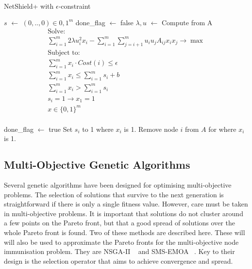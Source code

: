 \documentclass[11pt]{article}
\theoremstyle{definition}
\newcommand*\Let[2]{\State #1 $\gets$ #2}
\begin{document}
\begin{algorithm}
  \caption{NetShield+ with $\epsilon$-constraint
    \label{alg:enetshieldp}}
  \begin{algorithmic}[1]
    
    \Statex
    \Let{$s$}{ $(0,..,0) \in {0,1}^m $}
    \Let{done\_flag}{false}
        \Let{$\lambda, u$}{Compute from A}
       \begin{equation}
            \begin{gathered}
            \text{Solve:}\\
            \sum_{i=1}^{m} 2 \lambda  u_{i}^{2} x_{i} - \sum_{i=1}^{m} \sum_{j=i+1}^{m} u_{i} u_{j} A_{ij} x_{i} x_{j}\to \max \\
            \text{Subject to:}\\
            \sum_{i=1}^{m} x_{i} \cdot Cost(i) \leq \epsilon\\
            \sum_{i=1}^{m} x_{i} \leq \sum_{i=1}^m s_i + b \\
            \sum_{i=1}^{m} x_{i} > \sum_{i=1}^m s_i \\
            s_{i} = 1 \rightarrow x_{1} = 1 \\
            x \in \{0,1\}^{m} \\
            \end{gathered}
        \end{equation}
        
            \Let{done\_flag}{true}
        \Else
            \State Set $s_i$ to 1 where $x_i$ is 1.
            \State Remove node $i$ from $A$ for where $x_i$ is 1.
        \EndIf
    \EndWhile
  \end{algorithmic}
\end{algorithm}



\subsection{Multi-Objective Genetic Algorithms}

Several genetic algorithms have been designed for optimising multi-objective problems. The selection of solutions that survive to the next generation is straightforward if there is only a single fitness value. However, care must be taken in multi-objective problems. It is important that solutions do not cluster around a few points on the Pareto front, but that a good spread of solutions over the whole Pareto front is found. Two of these methods are described here. These will will also be used to approximate the Pareto fronts for the multi-objective node immunisation problem. They are NSGA-II ~\cite{deb2002fast} and SMS-EMOA ~\cite{emmerich2005emo}. Key to their design is the selection operator that aims to achieve convergence and spread.
\end{document}
